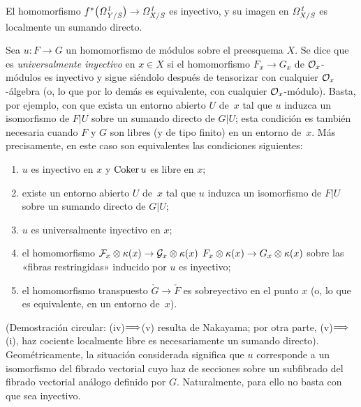 \begin{corollaire}
\label{II.4.4}
El homomorfismo
$f^*\big(\it{\Omega}^1_{Y/S}\big)\to\it{\Omega}^1_{X/S}$ es inyectivo, y su imagen en $\it{\Omega}^1_{X/S}$ es localmente un sumando directo.
\end{corollaire}

Sea $u\colon F\to G$ un homomorfismo de módulos sobre el preesquema $X$. Se dice que es \emph{universalmente inyectivo}
%
en $x\in X$ si el homomorfismo $F_x\to G_x$ de $\cal{O}_x$-módulos es inyectivo y sigue siéndolo después de tensorizar con cualquier $\cal{O}_x$-álgebra (o, lo que por lo demás es equivalente, con cualquier $\cal{O}_x$-módulo). Basta, por ejemplo, con que exista un entorno abierto $U$ de~$x$ tal que $u$ induzca un isomorfismo de $F|U$ sobre un sumando directo de $G|U$; esta condición es también necesaria cuando $F$ y $G$ son libres (y de tipo finito) en un entorno de~$x$. Más precisamente, en este caso son equivalentes las condiciones siguientes:
\begin{enumerate}
\item[(i)] $u$ es inyectivo en $x$ y $\Coker u$ es libre en $x$;
\item[(ii)] existe un entorno abierto $U$ de~$x$ tal que $u$ induzca un isomorfismo de $F|U$ sobre un sumando directo de $G|U$;
\item[(iii)] $u$ es universalmente inyectivo en $x$;
\item[(iv)] el homomorfismo
{$\cal{F}_x\otimes\kres(x)\to\cal{G}_x\otimes\kres(x)$}
{$F_x\otimes\kres(x)\to G_x\otimes\kres(x)$}
sobre las «fibras restringidas» inducido por $u$ es inyectivo;
\item[(v)] el homomorfismo transpuesto $\check{G}\to\check{F}$ es sobreyectivo en el punto $x$ (o, lo que es equivalente, en un entorno de~$x$).
\end{enumerate}
(Demostración circular: (iv)$\To$(v) resulta de Nakayama; por otra parte, (v)$\To$(i),
haz cociente localmente libre es necesariamente un sumando directo). Geométricamente, la situación considerada significa que $u$ corresponde a un isomorfismo del fibrado vectorial cuyo haz de secciones
sobre un subfibrado del fibrado vectorial análogo definido por $G$. Naturalmente, para ello no basta con que
sea inyectivo.

